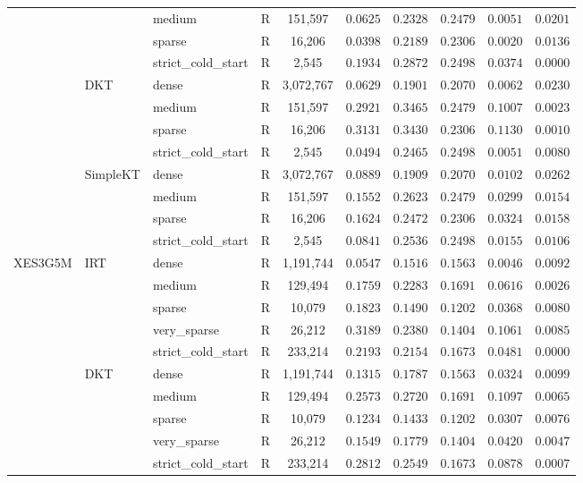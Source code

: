 \begin{table}[H]
{\begin{tabular}{lllrcccccc}
 &  & medium & R & 151,597 & $0.0625$ & $0.2328$ & $0.2479$ & $0.0051$ & $0.0201$ \\
 &  & sparse & R & 16,206 & $0.0398$ & $0.2189$ & $0.2306$ & $0.0020$ & $0.0136$ \\
 &  & strict\_cold\_start & R & 2,545 & $0.1934$ & $0.2872$ & $0.2498$ & $0.0374$ & $0.0000$ \\
 & DKT & dense & R & 3,072,767 & $0.0629$ & $0.1901$ & $0.2070$ & $0.0062$ & $0.0230$ \\
 &  & medium & R & 151,597 & $0.2921$ & $0.3465$ & $0.2479$ & $0.1007$ & $0.0023$ \\
 &  & sparse & R & 16,206 & $0.3131$ & $0.3430$ & $0.2306$ & $0.1130$ & $0.0010$ \\
 &  & strict\_cold\_start & R & 2,545 & $0.0494$ & $0.2465$ & $0.2498$ & $0.0051$ & $0.0080$ \\
 & SimpleKT & dense & R & 3,072,767 & $0.0889$ & $0.1909$ & $0.2070$ & $0.0102$ & $0.0262$ \\
 &  & medium & R & 151,597 & $0.1552$ & $0.2623$ & $0.2479$ & $0.0299$ & $0.0154$ \\
 &  & sparse & R & 16,206 & $0.1624$ & $0.2472$ & $0.2306$ & $0.0324$ & $0.0158$ \\
 &  & strict\_cold\_start & R & 2,545 & $0.0841$ & $0.2536$ & $0.2498$ & $0.0155$ & $0.0106$ \\
\midrule
XES3G5M & IRT & dense & R & 1,191,744 & $0.0547$ & $0.1516$ & $0.1563$ & $0.0046$ & $0.0092$ \\
 &  & medium & R & 129,494 & $0.1759$ & $0.2283$ & $0.1691$ & $0.0616$ & $0.0026$ \\
 &  & sparse & R & 10,079 & $0.1823$ & $0.1490$ & $0.1202$ & $0.0368$ & $0.0080$ \\
 &  & very\_sparse & R & 26,212 & $0.3189$ & $0.2380$ & $0.1404$ & $0.1061$ & $0.0085$ \\
 &  & strict\_cold\_start & R & 233,214 & $0.2193$ & $0.2154$ & $0.1673$ & $0.0481$ & $0.0000$ \\
 & DKT & dense & R & 1,191,744 & $0.1315$ & $0.1787$ & $0.1563$ & $0.0324$ & $0.0099$ \\
 &  & medium & R & 129,494 & $0.2573$ & $0.2720$ & $0.1691$ & $0.1097$ & $0.0065$ \\
 &  & sparse & R & 10,079 & $0.1234$ & $0.1433$ & $0.1202$ & $0.0307$ & $0.0076$ \\
 &  & very\_sparse & R & 26,212 & $0.1549$ & $0.1779$ & $0.1404$ & $0.0420$ & $0.0047$ \\
 &  & strict\_cold\_start & R & 233,214 & $0.2812$ & $0.2549$ & $0.1673$ & $0.0878$ & $0.0007$ \\

\end{tabular}}
\end{table}
